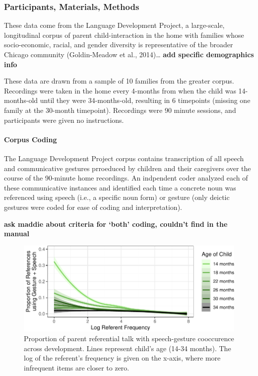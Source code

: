 \documentclass[10pt, letterpaper]{article}
\newenvironment{CodeChunk}{}{}
\begin{document}
\subsubsection{Participants, Materials,
Methods}\label{participants-materials-methods}

These data come from the Language Development Project, a large-scale,
longitudinal corpus of parent child-interaction in the home with
families whose socio-economic, racial, and gender diversity is
representative of the broader Chicago community (Goldin-Meadow et al.,
2014)\ldots{} \textbf{add specific demographics info}

These data are drawn from a sample of 10 families from the greater
corpus. Recordings were taken in the home every 4-months from when the
child was 14-months-old until they were 34-months-old, resulting in 6
timepoints (missing one family at the 30-month timepoint). Recordings
were 90 minute sessions, and participants were given no instructions.

\paragraph{Corpus Coding}\label{corpus-coding}

The Language Development Project corpus contains transcription of all
speech and communicative gestures prroeduced by children and their
caregivers over the course of the 90-minute home recordings. An
indpendent coder analyzed each of these communicative instances and
identified each time a concrete noun was referenced using speech (i.e.,
a specific noun form) or gesture (only deictic gestures were coded for
ease of coding and interpretation).

\textbf{ask maddie about criteria for `both' coding, couldn't find in
the manual}

\begin{CodeChunk}
\begin{figure}[h]

{\centering \includegraphics{figs/corpus_plot-1} 

}

\caption[Proportion of parent referential talk with speech-gesture cooccurence across development]{Proportion of parent referential talk with speech-gesture cooccurence across development. Lines represent child's age (14-34 months). The log of the referent's frequency is given on the x-axis, where more infrequent items are closer to zero.}\label{fig:corpus_plot}
\end{figure}
\end{CodeChunk}
\end{document}
